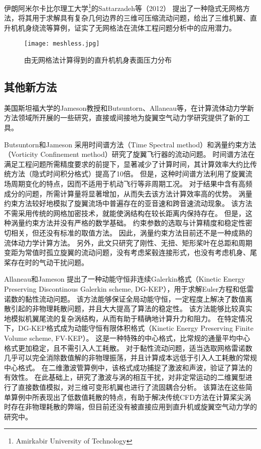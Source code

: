 伊朗阿米尔卡比尔理工大学\footnote{Amirkabir University of Technology}的Sattarzadeh等（2012）
提出了一种隐式无网格方法，将其用于求解具有复杂几何边界的三维可压缩流动问题，给出了三维机翼、直升机机身绕流等算例，证实了无网格法在流体工程问题分析中的应用潜力。
\begin{figure}[t!]
    \centering
    \texttt{[image: meshless.jpg]}
    \caption{由无网格法计算得到的直升机机身表面压力分布}
\end{figure}

\subsection{其他新方法}

美国斯坦福大学的Jameson教授和Butsuntorn、Allaneau等，在计算流体动力学新方法领域所开展的一些研究，直接或间接地为旋翼空气动力学研究提供了新的工具。

Butsuntorn和Jameson
采用时间谱方法（Time Spectral method）和涡量约束方法（Vorticity Confinement method）研究了旋翼飞行器的流动问题。
时间谱方法在满足工程问题所需精度要求的前提下，显著减少了计算时间，其计算效率大约比传统方法（隐式时间积分格式）提高了10倍。
但是，这种时间谱方法利用了旋翼流场周期变化的特点，因而不适用于机动飞行等非周期工况。
对于结果中含有高频成分的问题，所需计算量将显著增加，从而失去该方法计算效率高的优势。
涡量约束方法较好地模拟了旋翼流场中普遍存在的亚音速和跨音速流动现象。
该方法不需采用传统的网格加密技术，就能使涡结构在较长距离内保持存在。
但是，这种涡量约束方法并没有严格的数学基础。
约束参数的选取与计算精度和稳定性密切相关，但还没有标准的取值方法。
因此，涡量约束方法目前还不是一种成熟的流体动力学计算方法。
另外，此文只研究了刚性、无扭、矩形桨叶在总距和周期变距为常值时孤立旋翼的流动问题，没有考虑桨毂连接形式，也没有考虑机身、尾桨存在时的气动干扰问题。

Allaneau和Jameson
提出了一种动能守恒非连续Galerkin格式（Kinetic Energy Preserving Discontinous Galerkin scheme, DG-KEP），用于求解Euler方程和低雷诺数的黏性流动问题。
该方法能够保证全局动能守恒，一定程度上解决了数值离散引起的非物理耗散问题，并且大大提高了算法的稳定性。
该方法能够比较真实地模拟机翼尾流的复杂涡结构，从而有助于精确地计算升力和阻力。
在特定情况下，DG-KEP格式成为动能守恒有限体积格式（Kinetic Energy Preserving Finite Volume scheme, FV-KEP）。
这是一种特殊的中心格式，比常规的通量平均中心格式更加稳定，且不需引入人工耗散。
对于黏性流动问题，适当选取网格雷诺数几乎可以完全消除数值解的非物理振荡，并且计算成本远低于引入人工耗散的常规中心格式。
在二维激波管算例中，该格式成功捕捉了激波和声波，验证了算法的有效性。
在此基础上，研究了激波与涡的相互干扰，对非定常运动的二维翼型进行了直接数值模拟，对三维可变形机翼也进行了流固耦合分析。
该算法在这些简单算例中所表现出了低数值耗散的特点，有助于解决传统CFD方法在计算桨尖涡时存在非物理耗散的弊端，但目前还没有被直接应用到直升机或旋翼空气动力学的研究中。

